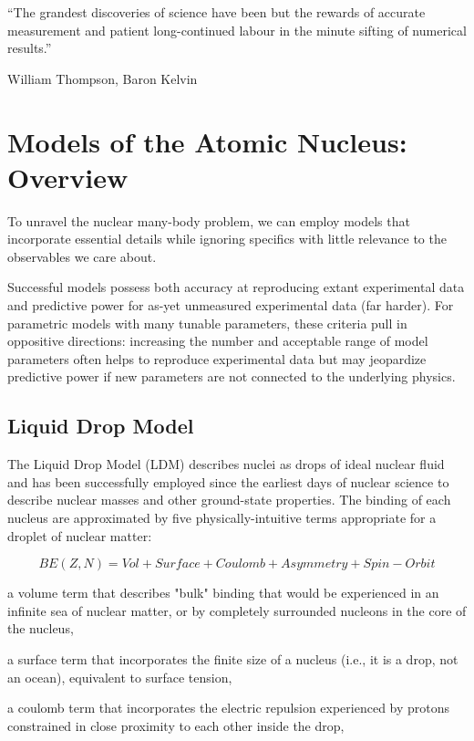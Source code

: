 \epigraph{``The grandest discoveries of science have been but the rewards of
    accurate measurement and patient long-continued labour in the minute
sifting of numerical results.''}{William Thompson,  Baron Kelvin}

\section{Models of the Atomic Nucleus: Overview}

To unravel the nuclear many-body problem, we can
employ models that incorporate essential details while ignoring specifics with
little relevance to the observables we care about.

Successful models possess both accuracy at reproducing extant experimental data
and predictive power for as-yet unmeasured experimental data (far harder). For parametric models
with many tunable parameters, these criteria pull in oppositive directions: increasing the number
and acceptable range of model parameters often helps to reproduce experimental data but may
jeopardize predictive power if new parameters are not connected to the underlying physics.

\subsection{Liquid Drop Model}

The Liquid Drop Model (LDM) describes nuclei as drops of ideal nuclear fluid and
has been successfully employed since the earliest days of nuclear science to
describe nuclear masses and other ground-state properties. The binding of each nucleus are
approximated by five physically-intuitive terms appropriate for a droplet of nuclear matter:

\begin{equation} \label{LDM}
    BE(Z, N) = Vol + Surface + Coulomb + Asymmetry + Spin-Orbit
\end{equation}

a volume term that describes "bulk" binding that would be experienced in an
infinite sea of nuclear matter, or by completely surrounded nucleons in the core of the nucleus,

a surface term that incorporates the finite size of a nucleus (i.e., it is a
drop, not an ocean), equivalent to surface tension,

a coulomb term that incorporates the electric repulsion experienced by protons
constrained in close proximity to each other inside the drop,

